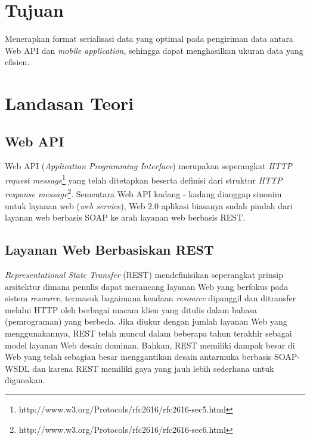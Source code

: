 \documentclass[a4paper, 12pt]{report}
\begin{document}
\section*{Tujuan}
\onehalfspacing 
Menerapkan format serialisasi data yang optimal pada pengiriman data antara Web API dan \textit{mobile application}, sehingga dapat menghasilkan ukuran data yang efisien.

\section*{Landasan Teori}
\subsection*{Web API}
\onehalfspacing Web API (\textit{Application Programming Interface}) merupakan seperangkat \textit{HTTP request message}\footnote{http://www.w3.org/Protocols/rfc2616/rfc2616-sec5.html} yang telah ditetapkan beserta definisi dari struktur \textit{HTTP response message}\footnote{http://www.w3.org/Protocols/rfc2616/rfc2616-sec6.html}. Sementara Web API kadang - kadang dianggap sinonim untuk layanan web (\textit{web service}), Web 2.0 aplikasi biasanya sudah pindah dari layanan web berbasis SOAP ke arah layanan web berbasis REST\cite{web-api}\cite{rest-soap}.

\subsection*{Layanan Web Berbasiskan REST}
\onehalfspacing \textit{Representational State Transfer} (REST) mendefinisikan seperangkat prinsip arsitektur dimana penulis dapat merancang layanan Web yang berfokus pada sistem \textit{resource}, termasuk bagaimana keadaan \textit{resource} dipanggil dan ditransfer melalui HTTP oleh berbagai macam klien yang ditulis dalam bahasa (pemrograman) yang berbeda. Jika diukur dengan jumlah layanan Web yang menggunakannya, REST telah muncul dalam beberapa tahun terakhir sebagai model layanan Web desain dominan. Bahkan, REST memiliki dampak besar di Web yang telah sebagian besar menggantikan desain antarmuka berbasis SOAP-WSDL dan karena REST memiliki gaya yang jauh lebih sederhana untuk digunakan\cite{ws-restful}.
\end{document}
